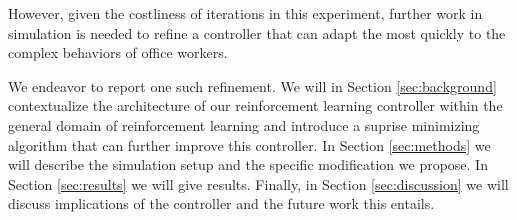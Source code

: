 However, given the costliness of iterations in this experiment, 
further work in simulation is needed to refine a controller that can adapt the most quickly to the complex behaviors of office workers. 

We endeavor to report one such refinement. 
We will in Section \ref{sec:background} contextualize the architecture of our reinforcement learning controller within the general domain of reinforcement learning 
and introduce a suprise minimizing algorithm that can further improve this controller.
In Section \ref{sec:methods} we will describe the simulation setup and the specific modification we propose. 
In Section \ref{sec:results} we will give results. 
Finally, in Section \ref{sec:discussion} we will discuss implications of the controller and the future work this entails. 
